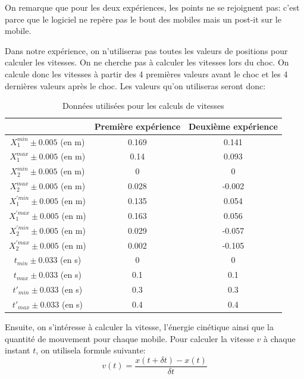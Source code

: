 \documentclass[12pt]{article}
\begin{document}
On remarque que pour les deux expériences, les points ne se rejoignent pas: c'est parce que le logiciel ne repère pas le bout des mobiles mais un post-it sur le mobile.  

Dans notre expérience, on n'utiliseras pas toutes les valeurs de positions pour calculer les vitesses. On ne cherche pas à calculer les vitesses lors du choc. On calcule donc les vitesses à partir des 4 premières valeurs avant le choc et les 4 dernières valeurs après le choc. 
\newpage
Les valeurs qu'on utiliseras seront donc:
\begin{table}[!h]
	\begin{center}
		\begin{tabular}{|c|c|c|}
		\hline
	
		& Première expérience & Deuxième expérience \\
		\hline
		$X_1^{min}\pm 0.005$ (en m) & 0.169 & 0.141 \\
		$X_1^{max}\pm 0.005$ (en m) & 0.14 & 0.093 \\
		$X_2^{min}\pm 0.005$ (en m) & 0 & 0 \\
		$X_2^{max}\pm 0.005$ (en m) & 0.028 & -0.002 \\
		$X_1^{'min}\pm 0.005$ (en m) & 0.135 & 0.054 \\
		$X_1^{'max}\pm 0.005$ (en m) & 0.163 & 0.056 \\
		$X_2^{'min}\pm 0.005$ (en m) & 0.029 & -0.057\\
		$X_2^{'max}\pm 0.005$ (en m) & 0.002 & -0.105 \\
		$t_{min}\pm 0.033$ (en s) &0 & 0 \\
		$t_{max}\pm 0.033$ (en s) &0.1 & 0.1 \\
		$t'_{min}\pm 0.033$ (en s) &0.3 & 0.3 \\
		$t'_{max}\pm 0.033$ (en s) & 0.4 & 0.4\\
		\hline
		\end{tabular}
		\caption{Données utilisées pour les calculs de vitesses}
		\label{Tabledonnéesutilisées}
	\end{center}
\end{table}

		
Ensuite, on s'intéresse à calculer la vitesse, l'énergie cinétique ainsi que la quantité de mouvement
pour chaque mobile.
Pour calculer la vitesse $v$ à chaque instant $t$, on utilisela formule suivante:
\begin{equation}
    v(t) = \frac{x(t + \delta t) - x(t)}{\delta t}
\end{equation}
\end{document}
